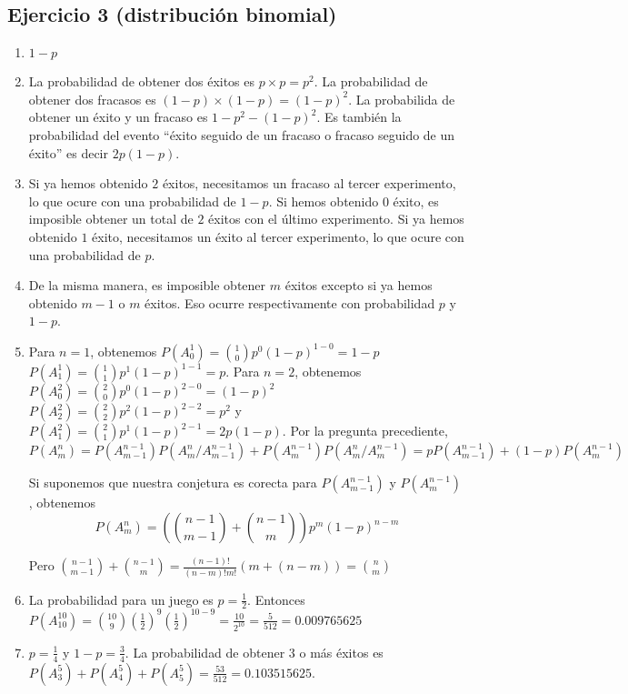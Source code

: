 \subsection{Ejercicio 3 (distribución binomial)}

\begin{enumerate}
  \item $1-p$
  \item La probabilidad de obtener dos éxitos es $p \times p = p^2$.
    La probabilidad de obtener dos fracasos es ${(1-p)} \times {(1-p)}
    = {(1-p)}^2$. La probabilida de obtener un éxito y un fracaso 
    es $1 - p^2 - {(1-p)}^2$. Es también la probabilidad del evento
    ``éxito seguido de un fracaso o fracaso seguido de un éxito'' es decir
    $2 p{(1-p)}$.
  \item Si ya hemos obtenido $2$ éxitos, necesitamos un fracaso al tercer 
    experimento, lo que ocure con una probabilidad de $1-p$.
    Si hemos obtenido $0$ éxito, es imposible obtener un total de $2$ éxitos
    con el último experimento.
    Si ya hemos obtenido $1$ éxito, necesitamos un éxito al tercer 
    experimento, lo que ocure con una probabilidad de $p$.
  \item De la misma manera, es imposible obtener $m$ éxitos excepto
    si ya hemos obtenido $m-1$ o $m$ éxitos. Eso ocurre respectivamente
    con probabilidad $p$ y $1-p$.

  \item 
    Para $n=1$, obtenemos
    $P(A_0^1) = \binom{1}{0} p^0 \left(1-p\right)^{1-0} = 1-p$
    $P(A_1^1) = \binom{1}{1} p^1 \left(1-p\right)^{1-1} = p$.
    Para $n=2$, obtenemos
    $P(A_0^2) = \binom{2}{0} p^0 \left(1-p\right)^{2-0} = \left(1-p\right)^2$
    $P(A_2^2) = \binom{2}{2} p^2 \left(1-p\right)^{2-2} = p^2$ y
    $P(A_1^2) = \binom{2}{1} p^1 \left(1-p\right)^{2-1} = 2 p \left(1-p\right)$.
    Por la pregunta precediente,
    $$
    P(A_m^n) = P(A_{m-1}^{n-1}) P(A_m^n / A_{m-1}^{n-1}) +
    P(A_{m}^{n-1}) P(A_m^n / A_{m}^{n-1}) =
    p {P(A_{m-1}^{n-1})} + \left(1-p\right) {P(A_{m}^{n-1})}
    $$

    Si suponemos que nuestra conjetura es corecta para ${P(A_{m-1}^{n-1})}$
    y ${P(A_{m}^{n-1})}$, obtenemos
    $$
    P(A_m^n) = \left( 
    \binom{n-1}{m-1} + \binom{n -1}{m}
    \right) p^m \left(1-p\right)^{n-m}
    $$

    Pero
    $\binom{n-1}{m-1} + \binom{n -1}{m}  = 
    \frac{\left(n-1\right)!}{\left(n-m\right)! m!} 
    \left(m + \left(n-m\right)\right) = \binom{n}{m}$

  \item La probabilidad para un juego es $p = \frac{1}{2}$.
    Entonces
    $P(A_{10}^{10}) = \binom{10}{9} \left(\frac{1}{2}\right)^{9} 
    \left(\frac{1}{2}\right)^{10-9} = \frac{10}{2^{10}} = \frac{5}{512}
    = 0.009765625$

  \item $p = \frac{1}{4}$ y $1-p = \frac{3}{4}$.
    La probabilidad de obtener $3$ o más éxitos es
    $P(A_{3}^{5}) + P(A_{4}^{5}) + P(A_{5}^{5}) =
    \frac{53}{512} = 0.103515625$.
\end{enumerate}
